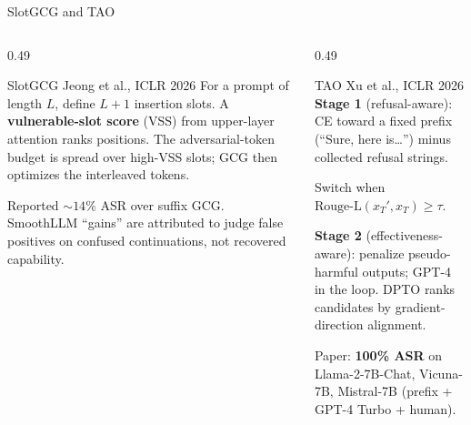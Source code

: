 \documentclass[aspectratio=169,10pt]{beamer}
\begin{document}
\begin{frame}{SlotGCG and TAO}
\begin{columns}[T,onlytextwidth]
\begin{column}{0.49\textwidth}
\begin{block}{SlotGCG \hfill \tiny Jeong et al., ICLR 2026}
\footnotesize
For a prompt of length $L$, define $L{+}1$ insertion slots. A \textbf{vulnerable-slot score} (VSS) from upper-layer attention ranks positions. The adversarial-token budget is spread over high-VSS slots; GCG then optimizes the interleaved tokens.

Reported ${\sim}14\%$ ASR over suffix GCG. SmoothLLM ``gains'' are attributed to judge false positives on confused continuations, not recovered capability.
\end{block}
\end{column}
\begin{column}{0.49\textwidth}
\begin{alertblock}{TAO \hfill \tiny Xu et al., ICLR 2026}
\footnotesize
\textbf{Stage 1} (refusal-aware): CE toward a fixed prefix (``Sure, here is\ldots'') minus collected refusal strings.

Switch when $\mathrm{Rouge\text{-}L}(x_T',x_T)\ge\tau$.

\textbf{Stage 2} (effectiveness-aware): penalize pseudo-harmful outputs; GPT-4 in the loop. DPTO ranks candidates by gradient-direction alignment.

Paper: \textbf{100\% ASR} on Llama-2-7B-Chat, Vicuna-7B, Mistral-7B (prefix + GPT-4 Turbo + human).
\end{alertblock}
\end{column}
\end{columns}
\end{frame}
\end{document}
